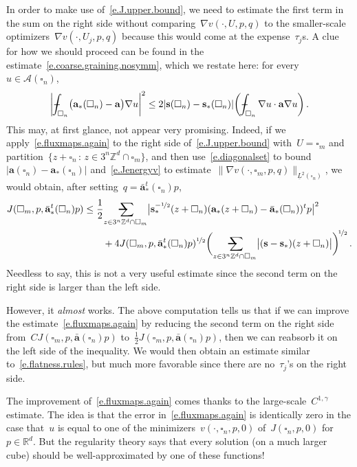\documentclass[11pt,twoside]{article} %
\makeatletter
\let\oldsquare\square %
\renewcommand{\square}{\oldsquare}
\numberwithin{equation}{section}
\theoremstyle{definition}
\let\originalleft\left
\let\originalright\right
\renewcommand{\left}{\mathopen{}\mathclose\bgroup\originalleft}
\renewcommand{\right}{\aftergroup\egroup\originalright}
\newcommand*{\Zd}{\ensuremath{\mathbb{Z}^d}}
\newcommand*{\Rd}{\ensuremath{\mathbb{R}^d}}
\newcommand{\s}{\mathbf{s}}
\renewcommand{\a}{\mathbf{a}}
\newcommand{\ahom}{\bar{\a}}
\newcommand{\cu}{\square}
\newcommand{\avsum}{\mathop{\mathpalette\avsuminner\relax}\displaylimits}
\newcommand\avsuminner[2]{%
  {\sbox0{$\m@th#1\sum$}%
   \vphantom{\usebox0}%
   \ooalign{%
     \hidewidth
     \smash{\,\rule[.23em]{8.8pt}{1.1pt} \relax}%
     \hidewidth\cr
   ~$\m@th#1\sum$\cr
   }%
  }%
}
\def\Xint#1{\mathchoice
{\XXint\displaystyle\textstyle{#1}}%
{\XXint\textstyle\scriptstyle{#1}}%
{\XXint\scriptstyle\scriptscriptstyle{#1}}%
{\XXint\scriptscriptstyle\scriptscriptstyle{#1}}%
\!\int}
\def\XXint#1#2#3{{\setbox0=\hbox{$#1{#2#3}{\int}$}
\vcenter{\hbox{$#2#3$}}\kern-.5\wd0}}
\def\fint{\Xint-}
\makeatother
\begin{document}
In order to make use of~\eqref{e.J.upper.bound}, we need to estimate the first term in the sum on the right side without comparing~$\nabla v(\cdot,U,p,q)$ to the smaller-scale optimizers~$\nabla v(\cdot,U_j,p,q)$ because this would come at the expense~$\tau_j$s. 
A clue for how we should proceed can be found in the estimate~\eqref{e.coarse.graining.nosymm}, which we restate here: for every~$u\in \mathcal{A}(\cu_n)$, 
\begin{equation}
\label{e.fluxmaps.again}
\biggl| 
\fint_{\cu_n} \bigl( \a_*(\cu_n) - \a \bigr) \nabla u
\biggr| ^2
\leq 
2\left| \s(\cu_n) - \s_*(\cu_n) \right| 
\biggl( \fint_{\cu_n}  \nabla u \cdot \a\nabla u  \biggr)
\,.
\end{equation}
This may, at first glance, not appear very promising. 
Indeed, if we apply~\eqref{e.fluxmaps.again} to the right side of~\eqref{e.J.upper.bound} with~$U=\cu_m$ and partition~$\{ z+\cu_n\,:\, z\in 3^n\Zd\cap \cu_m\}$, and then use~\eqref{e.diagonalset} to bound~$| \a(\cu_n) - \a_*(\cu_n)|$ and~\eqref{e.Jenergyv} to estimate~$\| \nabla v(\cdot,\cu_m,p,q)\|_{\underline{L}^2(\cu_n)}$, we would obtain, after setting~$q=\ahom_*^t(\cu_n)p$, 
\begin{align*}
J(\cu_m,p,\ahom_*^t(\cu_n)p ) 
&
\leq 
\frac 12\!\avsum_{z\in 3^n\Zd \cap\cu_m }
\bigl| \s_*^{-\nicefrac12}(z+\cu_n) (\a_*(z+\cu_n) - \ahom_*(\cu_n))^tp\bigr|^2
\notag \\ & \qquad 
+ 
4J(\cu_m,p,\ahom_*^t(\cu_n)p ) ^{\nicefrac12}
\biggl( \avsum_{z\in 3^n\Zd \cap\cu_m }
\bigl| (\s - \s_*) (z+\cu_n) \bigr|
\biggr)^{\!\nicefrac12}
\,.
\end{align*}
Needless to say, this is not a very useful estimate since the second term on the right side is larger than the left side. 

\smallskip

However, it \emph{almost} works. The above computation tells us that if we can improve the estimate~\eqref{e.fluxmaps.again} by reducing the second term on the right side from~$CJ(\cu_m,p,\ahom(\cu_n)p )$ to~$\frac12 J(\cu_m,p,\ahom(\cu_n)p )$, 
then we can reabsorb it on the left side of the inequality. We would then obtain an estimate similar to~\eqref{e.flatness.rules}, but much more favorable since there are no~$\tau_j$'s on the right side.

\smallskip

The improvement of~\eqref{e.fluxmaps.again} comes thanks to the large-scale~$C^{1,\gamma}$ estimate. The idea is that the error in~\eqref{e.fluxmaps.again} is identically zero in the case that~$u$ is equal to one of the minimizers~$v(\cdot,\cu_n,p,0)$ of~$J(\cu_n,p,0)$ for~$p\in\Rd$. But the regularity theory says that every solution (on a much larger cube) should be well-approximated by one of these functions!
\end{document}
